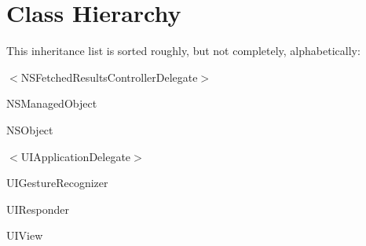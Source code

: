 \section{Class Hierarchy}
This inheritance list is sorted roughly, but not completely, alphabetically\-:\begin{DoxyCompactList}
\item {}
\item $<$N\-S\-Fetched\-Results\-Controller\-Delegate$>$\begin{DoxyCompactList}
\item {}
\end{DoxyCompactList}
\item N\-S\-Managed\-Object\begin{DoxyCompactList}
\item {}
\end{DoxyCompactList}
\item N\-S\-Object\begin{DoxyCompactList}
\item {}
\item {}
\end{DoxyCompactList}
\item $<$U\-I\-Application\-Delegate$>$\begin{DoxyCompactList}
\item {}
\end{DoxyCompactList}
\item U\-I\-Gesture\-Recognizer\begin{DoxyCompactList}
\item {}
\end{DoxyCompactList}
\item U\-I\-Responder\begin{DoxyCompactList}
\item {}
\end{DoxyCompactList}
\item U\-I\-View\begin{DoxyCompactList}

\end{DoxyCompactList}
\end{DoxyCompactList}
